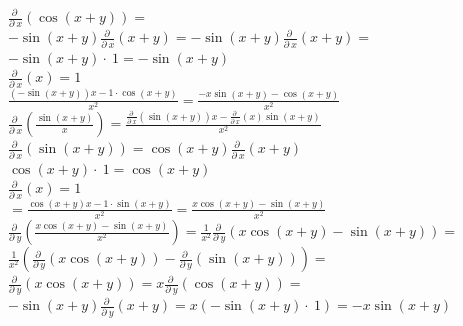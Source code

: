 \documentclass[13pt]{memoir}
\begin{document}
\begin{enumerate}
$\frac{\partial \:}{\partial \:x}\left(\cos \left(x+y\right)\right) =$ \\
$-\sin \left(x+y\right)\frac{\partial \:}{\partial \:x}\left(x+y\right) = -\sin \left(x+y\right)\frac{\partial \:}{\partial \:x}\left(x+y\right)=$\\
$-\sin \left(x+y\right)\cdot \:1 = -\sin \left(x+y\right)$ \\
$\frac{\partial \:}{\partial \:x}\left(x\right) = 1$\\

$\frac{\left(-\sin \left(x+y\right)\right)x-1\cdot \cos \left(x+y\right)}{x^2} = \frac{-x\sin \left(x+y\right)-\cos \left(x+y\right)}{x^2}$\\

$\frac{\partial \:}{\partial \:x}\left(\frac{\sin \left(x+y\right)}{x}\right) = \frac{\frac{\partial \:}{\partial \:x}\left(\sin \left(x+y\right)\right)x-\frac{\partial \:}{\partial \:x}\left(x\right)\sin \left(x+y\right)}{x^2}$\\

$\frac{\partial \:}{\partial \:x}\left(\sin \left(x+y\right)\right) = \cos \left(x+y\right)\frac{\partial \:}{\partial \:x}\left(x+y\right)$\\
$\cos \left(x+y\right)\cdot \:1 = \cos \left(x+y\right)$\\

$\frac{\partial \:}{\partial \:x}\left(x\right)=1$\\

$=\frac{\cos \left(x+y\right)x-1\cdot \sin \left(x+y\right)}{x^2} = \frac{x\cos \left(x+y\right)-\sin \left(x+y\right)}{x^2}$ \\

$\frac{\partial \:}{\partial \:y}\left(\frac{x\cos \left(x+y\right)-\sin \left(x+y\right)}{x^2}\right) = \frac{1}{x^2}\frac{\partial \:}{\partial \:y}\left(x\cos \left(x+y\right)-\sin \left(x+y\right)\right) =$  \\
$\frac{1}{x^2}\left(\frac{\partial \:}{\partial \:y}\left(x\cos \left(x+y\right)\right)-\frac{\partial \:}{\partial \:y}\left(\sin \left(x+y\right)\right)\right)=$\\

$\frac{\partial \:}{\partial \:y}\left(x\cos \left(x+y\right)\right) = x\frac{\partial \:}{\partial \:y}\left(\cos \left(x+y\right)\right) =$ \\
$-\sin \left(x+y\right)\frac{\partial \:}{\partial \:y}\left(x+y\right) =x\left(-\sin \left(x+y\right)\cdot \:1\right) = -x\sin \left(x+y\right) $ \\


\end{enumerate}
\end{document}
